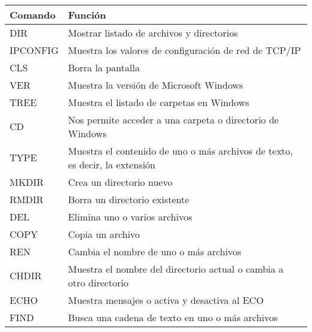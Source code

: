 \documentclass[12pt]{article}
\begin{document}
    \\
		\begin{tabular}{
			|p{5cm}|p{9cm}||}
			\hline
			\textbf{ Comando} & \textbf{  Función}\\ 
			\hline
			\hline DIR & Mostrar listado de archivos y directorios\\
			\hline IPCONFIG& Muestra los valores de configuración de red de TCP/IP\\
			\hline CLS & Borra la pantalla\\
			\hline VER& Muestra la versión de Microsoft Windows\\
			\hline TREE & Muestra el listado de carpetas en Windows\\
			\hline  CD & Nos permite acceder a una carpeta o directorio de Windows\\
			\hline TYPE & Muestra el contenido de uno o más archivos de texto, es decir, la extensión\\
			\hline MKDIR & Crea un directorio nuevo\\
			\hline RMDIR & Borra un directorio existente\\
			\hline DEL & Elimina uno o varios archivos\\
			\hline COPY & Copia un archivo\\
			\hline REN & Cambia el nombre de uno o más archivos\\
			\hline CHDIR & Muestra el nombre del directorio actual o cambia a otro directorio\\
			\hline ECHO & Muestra mensajes o activa y desactiva al ECO\\
			\hline FIND & Busca una cadena de texto en uno o más archivos\\
			\hline
			\end{tabular}
		\\
		\newpage
\end{document}
